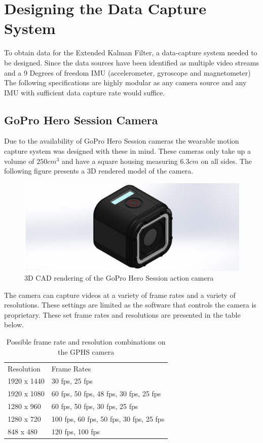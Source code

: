 \chapter{Designing the Data Capture System}
To obtain data for the Extended Kalman Filter, a data-capture system needed to be designed. Since the data sources have been identified as multiple video streams and a 9 Degrees of freedom IMU (accelerometer, gyroscope and magnetometer) The following specifications are highly modular as any camera source and any IMU with sufficient data capture rate would suffice. 

\section{GoPro Hero Session Camera}
Due to the availability of GoPro Hero Session cameras the wearable motion capture system was designed with these in mind. These cameras only take up a volume of $250cm^3$ and have a square housing measuring $6.3cm$ on all sides. The following figure presents a 3D rendered model of the camera.

\begin{figure}[!ht] 
\captionsetup{width=0.8\linewidth, font=small}  
\includegraphics[width=0.8\linewidth]{figures/GoProHero4Session.JPG}
\caption{3D CAD rendering of the GoPro Hero Session action camera}
\label{fig:GoProHero4Session}
\end{figure}

The camera can capture videos at a variety of frame rates and a variety of resolutions. These settings are limited as the software that controls the camera is proprietary. These set frame rates and resolutions are presented in the table below.

\begin{table}[!ht]
\centering
\caption{Possible frame rate and resolution combinations on the GPHS camera}
\label{framesres}
\begin{tabular}{ll}
Resolution  & Frame Rates                             \\
1920 x 1440 & 30 fps, 25 fps                          \\
1920 x 1080 & 60 fps, 50 fps, 48 fps, 30 fps, 25 fps  \\
1280 x 960  & 60 fps, 50 fps, 30 fps, 25 fps          \\
1280 x 720  & 100 fps, 60 fps, 50 fps, 30 fps, 25 fps \\
848 x 480   & 120 fps, 100 fps                       
\end{tabular}
\end{table}

